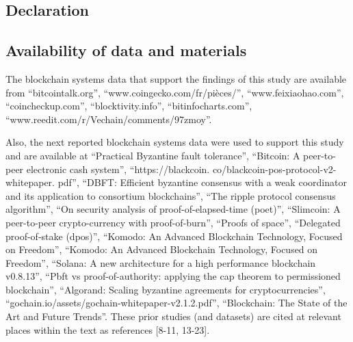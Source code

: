 \documentclass[doublespacing]{bmcart}
\begin{document}
\begin{CJK*}{UTF8}{gbsn}



\renewcommand\thesection{\Roman{section}}
\renewcommand\thesubsection{\Roman{section}.\alph{subsection}}



\section*{\centering Declaration}
\subsection*{\centering Availability of data and materials}


	The blockchain systems data that support the findings of this study are available from ``bitcointalk.org'', ``www.coingecko.com/fr/pièces/'', ``www.feixiaohao.com'', ``coincheckup.com'', ``blocktivity.info'', ``bitinfocharts.com'', \\``www.reedit.com/r/Vechain/comments/97zmoy''.

	Also, the next reported blockchain systems data were used to support this study and are available at ``Practical Byzantine fault tolerance'', ``Bitcoin: A peer-to-peer electronic cash system'', ``https://blackcoin. co/blackcoin-pos-protocol-v2-whitepaper. pdf'', ``DBFT: Efficient byzantine consensus with a weak coordinator and its application to consortium blockchains'', ``The ripple protocol consensus algorithm'', ``On security analysis of proof-of-elapsed-time (poet)'', ``Slimcoin: A peer-to-peer crypto-currency with proof-of-burn'', ``Proofs of space'', ``Delegated proof-of-stake (dpos)'', ``Komodo: An Advanced Blockchain Technology, Focused on Freedom'', ``Komodo: An Advanced Blockchain Technology, Focused on Freedom'', ``Solana: A new architecture for a high
performance blockchain v0.8.13'', ``Pbft vs proof-of-authority: applying the cap theorem to permissioned blockchain'', ``Algorand: Scaling byzantine agreements for cryptocurrencies'', ``gochain.io/assets/gochain-whitepaper-v2.1.2.pdf'', ``Blockchain: The State of the Art and Future Trends''. These prior studies (and datasets) are cited at relevant places within the text as references [8-11, 13-23].


\end{CJK*}
\end{document}
